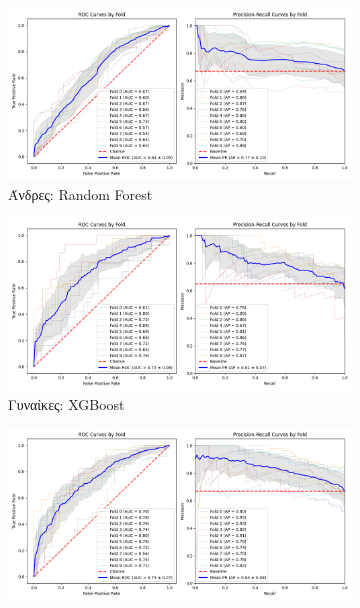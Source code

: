 \documentclass[12pt]{report}
\begin{document}
\begin{figure}[H]
\begin{subfigure}[b]{0.48\textwidth}
                        \includegraphics[width=\textwidth]{ML/CV/stratified_Male_50-70_RF_useSMOTE_False_k_fold_validation.png}
                        \caption{Άνδρες: Random Forest}
                        \label{stratified_Male_50-70_RF_useSMOTE_False_k_fold_validation}
                    \end{subfigure}
                    \vspace{0.5cm}
                    \begin{subfigure}[b]{0.48\textwidth}
                        \includegraphics[width=\textwidth]{ML/CV/stratified_Female_50-70_XGBOOST_useSMOTE_False_k_fold_validation.png}
                        \caption{Γυναίκες: XGBoost}
                        \label{stratified_Female_50-70_XGBOOST_useSMOTE_False_k_fold_validation}
                    \end{subfigure}
                    \hfill
                    \begin{subfigure}[b]{0.48\textwidth}
                        \includegraphics[width=\textwidth]{ML/CV/stratified_Male_50-70_XGBOOST_useSMOTE_False_k_fold_validation.png}

\end{subfigure}
\end{figure}
\end{document}

